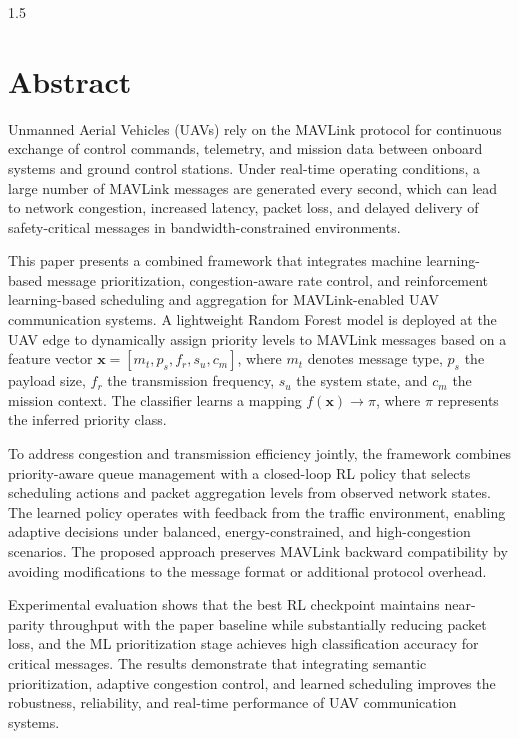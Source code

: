 
\newpage
{}
\thispagestyle{empty}
%
\begin{spacing}{1.5}
%
\chapter*{Abstract}


Unmanned Aerial Vehicles (UAVs) rely on the MAVLink protocol for continuous exchange of control commands, telemetry, and mission data between onboard systems and ground control stations. Under real-time operating conditions, a large number of MAVLink messages are generated every second, which can lead to network congestion, increased latency, packet loss, and delayed delivery of safety-critical messages in bandwidth-constrained environments.

This paper presents a combined framework that integrates machine learning-based message prioritization, congestion-aware rate control, and reinforcement learning-based scheduling and aggregation for MAVLink-enabled UAV communication systems. A lightweight Random Forest model is deployed at the UAV edge to dynamically assign priority levels to MAVLink messages based on a feature vector $\mathbf{x} = [m_t, p_s, f_r, s_u, c_m]$, where $m_t$ denotes message type, $p_s$ the payload size, $f_r$ the transmission frequency, $s_u$ the system state, and $c_m$ the mission context. The classifier learns a mapping $f(\mathbf{x}) \rightarrow \pi$, where $\pi$ represents the inferred priority class.

To address congestion and transmission efficiency jointly, the framework combines priority-aware queue management with a closed-loop RL policy that selects scheduling actions and packet aggregation levels from observed network states. The learned policy operates with feedback from the traffic environment, enabling adaptive decisions under balanced, energy-constrained, and high-congestion scenarios. The proposed approach preserves MAVLink backward compatibility by avoiding modifications to the message format or additional protocol overhead.

Experimental evaluation shows that the best RL checkpoint maintains near-parity throughput with the paper baseline while substantially reducing packet loss, and the ML prioritization stage achieves high classification accuracy for critical messages. The results demonstrate that integrating semantic prioritization, adaptive congestion control, and learned scheduling improves the robustness, reliability, and real-time performance of UAV communication systems.

\end{spacing}